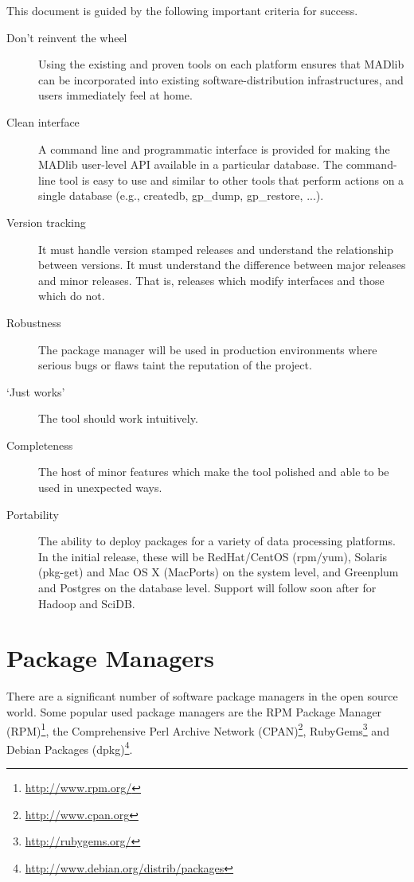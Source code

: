\documentclass[11pt]{article}
\begin{document}
{This document is guided by the following important criteria for success.

	\begin{description}
		\item[Don't reinvent the wheel]
			Using the existing and proven tools on each platform ensures that MADlib can be incorporated into existing software-distribution infrastructures, and users immediately feel at home.

		\item[Clean interface] A command line and programmatic interface is provided for making the MADlib user-level API available in a particular database. The command-line tool is easy to use and similar to other tools that perform actions on a single database (e.g., createdb, gp\_dump, gp\_restore, ...).

		\item[Version tracking] It must handle version stamped releases and
		understand the relationship between versions. It must understand
		the difference between major releases and minor releases. That is,
		releases which modify interfaces and those which do not.

		\item[Robustness] The package manager will be used in production
		environments where serious bugs or flaws taint the reputation of the
		project.

		\item[`Just works'] The tool should work intuitively.

		\item[Completeness] The host of minor features which make the tool
		polished and able to be used in unexpected ways.

		\item[Portability] The ability to deploy packages for a variety of data processing platforms. In the initial release, these will be RedHat/CentOS (rpm/yum), Solaris (pkg-get) and Mac OS X (MacPorts) on the system level, and Greenplum and Postgres on the database level. Support will follow soon after for Hadoop and SciDB.

	\end{description}

\section{Package Managers}

There are a significant number of software package managers in the open source
world. Some popular used package managers are the
RPM Package Manager (RPM)\footnote{\url{http://www.rpm.org/}}, 
the Comprehensive Perl Archive Network
(CPAN)\footnote{\url{http://www.cpan.org}},
RubyGems\footnote{\url{http://rubygems.org/}} and
Debian Packages (dpkg)\footnote{\url{http://www.debian.org/distrib/packages}}.

}
\end{document}
